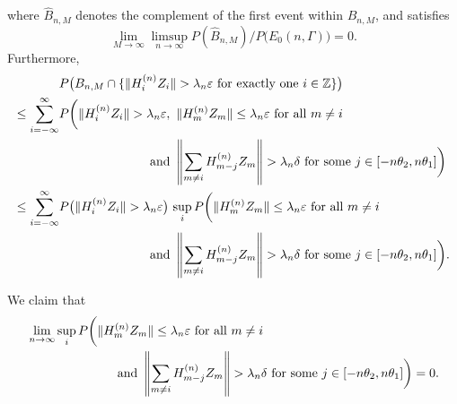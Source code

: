 \documentclass[11pt,reqno]{amsart}
\numberwithin{equation}{section}
\theoremstyle{definition}
\theoremstyle{remark}
\theoremstyle{definition}
\newcommand{\eps}{\varepsilon}
\newcommand{\ZZ}{\mathbb{Z}}
\newcommand{\bbz}{\ZZ}
\begin{document}
where $\hat B_{n,M}$ denotes the complement of the first event within $B_{n,M}$, and satisfies 
\begin{equation} \label{e:Bnm1.1}
\lim_{M\to\infty} \limsup_{n\to\infty} P(\hat
B_{n,M})/P\bigl(E_0(n,\Gamma)\bigr)=0.
\end{equation}
Furthermore,
\begin{align} \label{e: Bnm1.2}
&P\bigl( B_{n,M} \cap \{ \| H_i^{(n)} Z_i\|>\lambda_n\eps
  \ \text{for exactly one} \ i\in\bbz\}\bigr) \\
 \notag  \leq\sum_{i=-\infty}^\infty &P\biggl(  \| H_i^{(n)}
  Z_i\|>\lambda_n\eps, \ \| H_m^{(n)} Z_m\|\leq \lambda_n\eps \
  \text{for all} \ m\not=i \\
\notag & \hskip 1in \text{and} \ 
\left\| \sum_{m\not= i} H_{m-j}^{(n)} Z_m\right\| >\lambda_n\delta \ \text{for some} \ j \in
  [-n\theta_2,n\theta_1]\biggr)\\
\notag \leq \sum_{i=-\infty}^\infty &P\bigl(  \| H_i^{(n)}
  Z_i\|>\lambda_n\eps\bigr) \, \sup_i P\biggl( \| H_m^{(n)} Z_m\|\leq \lambda_n\eps \
  \text{for all} \ m\not=i \\
\notag & \hskip 1in \text{and} \ 
\left\| \sum_{m\not= i} H_{m-j}^{(n)} Z_m\right\| >\lambda_n\delta \ \text{for some} \ j \in
  [-n\theta_2,n\theta_1]\biggr). 
\end{align}

We claim that 
\begin{align} \label{e:last.upper}
&\lim_{n\to\infty}\sup_i P\biggl( \| H_m^{(n)} Z_m\|\leq \lambda_n\eps
                                     \ \text{for all} \ m\not=i \\
 \notag &\hskip 1in  \text{and} \ 
\left\| \sum_{m\not= i} H_{m-j}^{(n)} Z_m\right\| >\lambda_n\delta \ \text{for some} \ j \in
[-n\theta_2,n\theta_1]\biggr) = 0.
\end{align}
\end{document}
